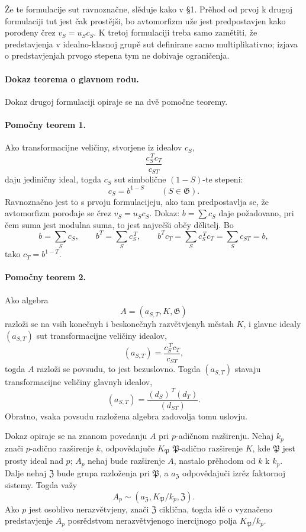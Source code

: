 \documentclass[11pt]{article}
\providecommand{\Gg}{\mathfrak G}
\providecommand{\PP}{\mathfrak P}
\begin{document}
Že te formulacije sut ravnoznačne, slěduje kako v §1. Prěhod od prvoj k drugoj formulaciji tut jest čak prostějši, bo avtomorfizm uže jest predpostavjen kako porođeny črez \(v_S=u_Sc_S\). K tretoj formulaciji treba samo zamětiti, že predstavjenja v idealno-klasnoj grupě sut definirane samo multiplikativno; izjava o predstavjenjah prvogo stepena tym ne dobivaje ograničenja.

\paragraph{Dokaz teorema o glavnom rodu.}
Dokaz drugoj formulaciji opiraje se na dvě pomočne teoremy.

\paragraph{Pomočny teorem 1.}
Ako transformacijne veličiny, stvorjene iz idealov \(c_S\),
\[
        \frac{c_S^{\,T}c_T}{c_{ST}}
\]
daju jediničny ideal, togda \(c_S\) sut simbolične \((1-S)\)-te stepeni:
\[
        c_S=b^{1-S}\qquad(S\in\Gg).
\]
Ravnoznačno jest to s prvoju formulacijeju, ako tam predpostavlja se, že avtomorfizm porođaje se črez \(v_S=u_Sc_S\). Dokaz: \(b=\sum c_S\) daje požadovano, pri čem suma jest modulna suma, to jest največši občy dělitelj. Bo
\[
        b=\sum_S c_S,\qquad
        b^T=\sum_S c_S^{\,T},\qquad
        b^T c_T=\sum_S c_S^{\,T}c_T=\sum_S c_{ST}=b,
\]
tako \(c_T=b^{1-T}\).

\paragraph{Pomočny teorem 2.}
Ako algebra
\[
        A=(a_{S,T},K,\Gg)
\]
razloži se na vsih konečnyh i beskonečnyh razvětvjenyh městah \(K\), i glavne idealy \((a_{S,T})\) sut transformacijne veličiny idealov,
\[
        (a_{S,T})=\frac{c_S^{\,T}c_T}{c_{ST}},
\]
togda \(A\) razloži se povsudu, to jest bezuslovno. Togda \((a_{S,T})\) stavaju transformacijne veličiny glavnyh idealov,
\[
        (a_{S,T})=\frac{(d_S)^{\,T}(d_T)}{(d_{ST})}.
\]
Obratno, vsaka povsudu razložena algebra zadovolja tomu uslovju.

Dokaz opiraje se na znanom povedanju \(A\) pri \(p\)-adičnom razširenju. Nehaj \(k_p\) znači \(p\)-adično razširenje \(k\), odpovědajuče \(K_\PP\) \(\PP\)-adično razširenje \(K\), kde \(\PP\) jest prosty ideal nad \(p\); \(A_p\) nehaj bude razširenje \(A\), nastalo prěhodom od \(k\) k \(k_p\). Dalje nehaj \(\mathfrak Z\) bude grupa razloženja pri \(\PP\), a \(a_{\mathfrak Z}\) odpovědajuči izrěz faktornoj sistemy. Togda važy
\[
        A_p\sim (a_{\mathfrak Z},K_\PP/k_p,\mathfrak Z).
\]
Ako \(p\) jest osoblivo nerazvětvjeny, znači \(\mathfrak Z\) ciklična, togda idě o vyznačeno predstavjenje \(A_p\) posrědstvom nerazvětvjenogo inercijnogo polja \(K_\PP/k_p\).
\end{document}
